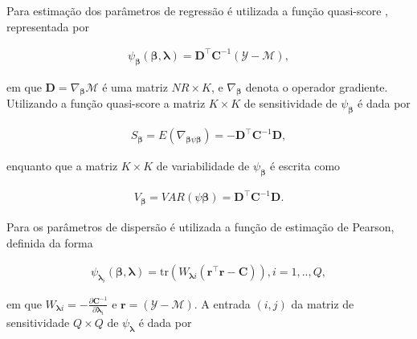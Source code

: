 \documentclass[AMA,STIX1COL]{WileyNJD-v2}
\begin{document}
Para estimação dos parâmetros de regressão é utilizada a função quasi-score \citep{Liang86}, representada por

\begin{equation}
      \begin{aligned}
        \psi_{\boldsymbol{\beta}}(\boldsymbol{\beta},
          \boldsymbol{\lambda}) = \boldsymbol{D}^\top
            \boldsymbol{C}^{-1}(\mathcal{Y} - \mathcal{M}),
\end{aligned}
\end{equation}

\noindent em que $\boldsymbol{D} = \nabla_{\boldsymbol{\beta}} \mathcal{M}$ é uma matriz $NR \times K$, e $\nabla_{\boldsymbol{\beta}}$ denota o operador gradiente. Utilizando a função quasi-score a matriz $K \times K$ de sensitividade de $\psi_{\boldsymbol{\beta}}$ é dada por

\begin{equation}
\begin{aligned}
S_{\boldsymbol{\beta}} = E(\nabla_{\boldsymbol{\beta} \psi \boldsymbol{\beta}}) = -\boldsymbol{D}^{\top} \boldsymbol{C}^{-1} \boldsymbol{D},
\end{aligned}
\end{equation}

\noindent enquanto que a matriz $K \times K$ de variabilidade de $\psi_{\boldsymbol{\beta}}$ é escrita como

\begin{equation}
\begin{aligned}
V_{\boldsymbol{\beta}} = VAR(\psi \boldsymbol{\beta}) = \boldsymbol{D}^{\top} \boldsymbol{C}^{-1} \boldsymbol{D}.
\end{aligned}
\end{equation}

Para os parâmetros de dispersão é utilizada a função de estimação de Pearson, definida da forma

\begin{equation}
  \begin{aligned}
    \psi_{\boldsymbol{\lambda}_i}(\boldsymbol{\beta},
    \boldsymbol{\lambda}) =
    \mathrm{tr}(W_{\boldsymbol{\lambda}i}
    (\boldsymbol{r}^\top\boldsymbol{r} -
    \boldsymbol{C})),  i = 1,.., Q, 
  \end{aligned}
\end{equation}

\noindent em que $W_{\boldsymbol{\lambda}i} = -\frac{\partial \boldsymbol{C}^{-1}}{\partial \boldsymbol{\lambda}_i}$ e $\boldsymbol{r} = (\mathcal{Y} - \mathcal{M})$. A entrada $(i,j)$ da matriz de sensitividade $Q \times Q$ de $\psi_{\boldsymbol{\lambda}}$ é dada por
\end{document}
